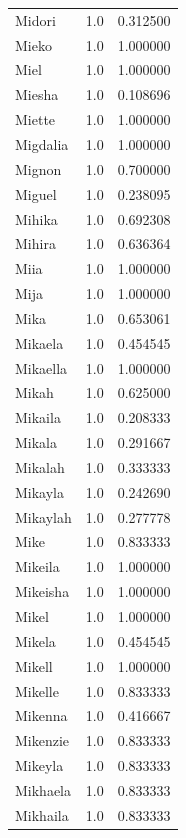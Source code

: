 \documentclass[
  letterpaper,
  DIV=11,
  numbers=noendperiod]{scrreprt}
\begin{document}
\begin{tabular}{lrr}
Midori          &   1.0 &   0.312500 \\
Mieko           &   1.0 &   1.000000 \\
Miel            &   1.0 &   1.000000 \\
Miesha          &   1.0 &   0.108696 \\
Miette          &   1.0 &   1.000000 \\
Migdalia        &   1.0 &   1.000000 \\
Mignon          &   1.0 &   0.700000 \\
Miguel          &   1.0 &   0.238095 \\
Mihika          &   1.0 &   0.692308 \\
Mihira          &   1.0 &   0.636364 \\
Miia            &   1.0 &   1.000000 \\
Mija            &   1.0 &   1.000000 \\
Mika            &   1.0 &   0.653061 \\
Mikaela         &   1.0 &   0.454545 \\
Mikaella        &   1.0 &   1.000000 \\
Mikah           &   1.0 &   0.625000 \\
Mikaila         &   1.0 &   0.208333 \\
Mikala          &   1.0 &   0.291667 \\
Mikalah         &   1.0 &   0.333333 \\
Mikayla         &   1.0 &   0.242690 \\
Mikaylah        &   1.0 &   0.277778 \\
Mike            &   1.0 &   0.833333 \\
Mikeila         &   1.0 &   1.000000 \\
Mikeisha        &   1.0 &   1.000000 \\
Mikel           &   1.0 &   1.000000 \\
Mikela          &   1.0 &   0.454545 \\
Mikell          &   1.0 &   1.000000 \\
Mikelle         &   1.0 &   0.833333 \\
Mikenna         &   1.0 &   0.416667 \\
Mikenzie        &   1.0 &   0.833333 \\
Mikeyla         &   1.0 &   0.833333 \\
Mikhaela        &   1.0 &   0.833333 \\
Mikhaila        &   1.0 &   0.833333 \\

\end{tabular}
\end{document}
